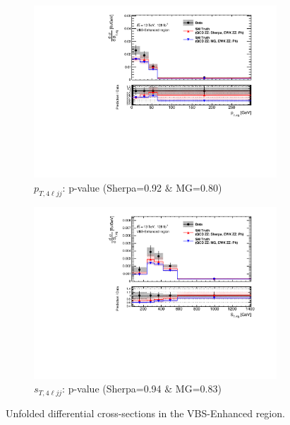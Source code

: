 \begin{figure}[!htbp]
\begin{subfigure}{.49\textwidth}
        \includegraphics[width=.98\linewidth]{figures/Results/CrossSection_VBSEnhanced/xs_ptzzjj_SR.pdf}
        \caption{ \footnotesize{$p_{T,4\ell jj}$: p-value (Sherpa=0.92 $\&$ MG=0.80)}}
    \end{subfigure}
    \begin{subfigure}{.49\textwidth}
        \centering
        \includegraphics[width=.98\linewidth]{figures/Results/CrossSection_VBSEnhanced/xs_stzzjj_SR.pdf}
        \caption{ \footnotesize{$s_{T, 4\ell jj}$: p-value (Sherpa=0.94 $\&$ MG=0.83)}}
    \end{subfigure}
    \caption{Unfolded differential cross-sections in the VBS-Enhanced region.} \label{fig:unfolded_xs_VBS_Enhanced_a}
\end{figure}

